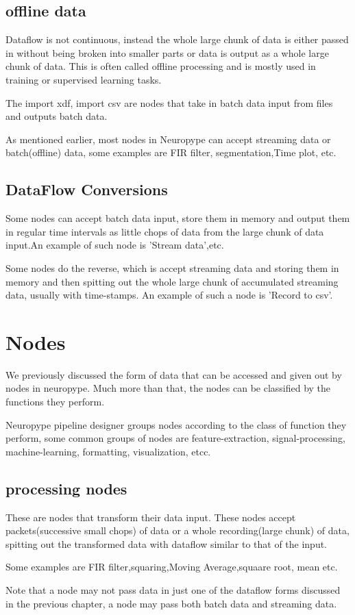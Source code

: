 \documentclass[16pt]{book}
\begin{document}
\section{offline data}
\par\noindent Dataflow is not continuous, instead the whole large chunk of data is either passed in without being broken 
into smaller parts or data is output as a whole large chunk of data. This is often called offline processing and is 
mostly used in training or supervised learning tasks.
\par\noindent The import xdf, import csv are nodes that take in batch data input from files and outputs batch data.
\par\noindent As mentioned earlier, most nodes in Neuropype can accept streaming data or batch(offline) data, 
some examples are FIR filter, segmentation,Time plot, etc. 
\section{DataFlow Conversions}
\par\noindent Some nodes can accept batch data input, store them in memory and output them in regular time intervals as 
little chops of data from the large chunk of data input.An example of such node is 'Stream data',etc.
\par\noindent Some nodes do the reverse, which is accept streaming data and storing them in memory and then spitting out 
the whole large chunk of accumulated streaming data, usually with time-stamps.
An example of such a node is 'Record to csv'.

\chapter{Nodes}
\par\noindent We previously discussed the form of data that can be accessed and given out by nodes in neuropype. 
Much more than that, the nodes can be classified by the functions they perform.
\par\noindent Neuropype pipeline designer groups nodes according to the class of function they perform, some common 
groups of nodes are feature-extraction, signal-processing, machine-learning, formatting, visualization, etcc.
\section{processing nodes}
\par\noindent These are nodes that transform their data input. These nodes accept packets(successive small chops) of 
data or a whole recording(large chunk) of data, spitting out the transformed data with dataflow similar to that of the 
input.
\par\noindent Some examples are FIR filter,squaring,Moving Average,squaare root, mean etc.
\par\noindent Note that a node may not pass data in just one of the dataflow forms discussed in the previous chapter,
 a node may pass both batch data and streaming data.
\end{document}
